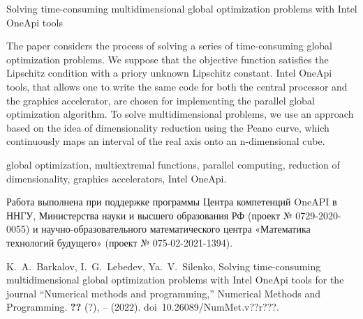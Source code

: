 \documentclass[10pt,a4paper]{book}
\begin{document}
    {Solving time-consuming multidimensional global optimization problems with Intel OneApi tools}
    
    {The paper considers the process of solving a series of time-consuming global optimization problems. We suppose that the objective function satisfies the Lipschitz condition with a priory unknown Lipschitz constant. Intel OneApi tools, that allows one to write the same code for both the central processor and the graphics accelerator, are chosen for implementing the parallel global optimization algorithm. To solve multidimensional problems, we use an approach based on the idea of dimensionality reduction using the Peano curve, which continuously maps an interval of the real axis onto an n-dimensional cube.}

        {global optimization,
multiextremal functions,
parallel computing,
reduction of dimensionality,
graphics accelerators,
Intel OneApi.}

    {Работа выполнена при поддержке программы Центра компетенций OneAPI в ННГУ, Министерства науки и высшего образования РФ (проект № 0729-2020-0055) и научно-образовательного математического центра «Математика технологий будущего» (проект № 075-02-2021-1394).}

    {K.~A.~Barkalov, I.~G.~Lebedev, Ya.~V.~Silenko,
    Solving time-consuming multidimensional global optimization problems with Intel OneApi tools 
    for the journal ``Numerical methods and programming,''
    Numerical Methods and Programming. \textbf{??} (?), 
    \pageref*{firstPage}--\pageref*{LastPage} (2022).
    doi~10.26089/NumMet.v??r???.}
\end{document}
